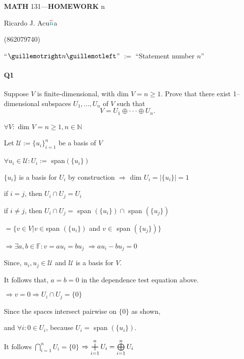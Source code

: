 \documentclass{article}
\DeclareMathOperator*{\bigplus}{\scalerel*{+}{\textstyle\sum}}
\begin{document}
\begin{center}
  \textbf{MATH} 131---\textbf{HOMEWORK} n

  \color{red}R\color{teal}icardo
  \color{red}J\color{cyan}.
  \color{red}A\color{teal}cu$\color{red}{\widetilde{\color{teal}\text{n}}}$\color{teal}a\color{black}

  \color{teal}(\color{red}862079740\color{teal})\color{black}
\end{center}\vspace{1.618em}

``$\guillemotright n \guillemotleft$'' $:= $ ``Statement number $n$''

\paragraph{Q1} Suppose $V$ is finite-dimensional, with dim $V = n ≥ 1$. Prove that
there exist 1–dimensional subspaces $U_1 , ... , U_n$ of $V$ such that
\[V = U_1 ⊕ ··· ⊕ U_n.\]

\vspace{0.618 em}

$\forall V:$ dim $V = n \geq 1, n \in \mathbb{N}$

Let $\mathcal{U}:=\{u_i\}_{i=1}^n$ be a basis of $V$

$\forall u_i \in \mathcal{U}: U_i :=$ span$(\{u_i\})$

$\{u_i\}$ is a basis for $U_i$ by construction $\Rightarrow$ dim $U_i
= |\{u_i\}| = 1$

if $i = j$, then $U_i \cap U_j = U_i$

if $i \neq j$, then $U_i \cap U_j =$ span $(\{u_i\}) \cap$ span
$(\{u_j\})$

$= \{v \in V| v \in
$span $(\{u_i\})$ and $ v \in$ span $(\{u_j\})\}$

$\Rightarrow \exists a,b\in \mathbb{F}: v = a u_i = b u_j$ $\Rightarrow a u_i - b u_j = 0$

Since, $u_i, u_j \in \mathcal{U}$ and $\mathcal{U}$  is a basis for
$V$.

It follows that,
$a = b = 0$ in the dependence test equation above.

$\Rightarrow v = 0 \Rightarrow U_i \cap U_j = \{0\}$

Since the spaces intersect pairwise on $\{0\}$ as shown,

and $\forall
i: 0 \in
U_i$, because $U_i =$ span $(\{u_i\})$.

It follows $\bigcap\limits_{i=1}^n U_i = \{0\}$
$\Rightarrow \bigplus\limits_{i=1}^n U_i = \bigoplus\limits_{i=1}^n U_i$
\end{document}
